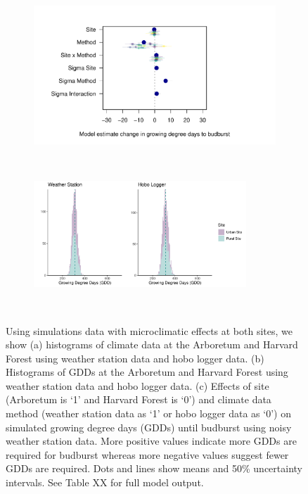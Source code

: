 \documentclass{article}\usepackage[]{graphicx}\usepackage[]{color}
\begin{document}
\begin{figure}[H]
  \begin{subfigure}{.5\linewidth}
    \caption{}
      \centering
      \includegraphics[height=7cm, width=11cm]{..//analyses/figures/muplot_micros.pdf}
      \label{fig:muplotmicros}
  \end{subfigure}%
    \begin{subfigure}{.5\linewidth}
      \caption{}
      \centering
      \includegraphics[height=4cm, width=8cm]{..//analyses/figures/gdd_methods_micros.pdf}
    \label{fig:gddmicros}
  \end{subfigure}\\[1ex]
\caption{ Using simulations data with microclimatic effects at both sites, we show (a) histograms of climate data at the Arboretum and Harvard Forest using weather station data and hobo logger data. (b) Histograms of GDDs at the Arboretum and Harvard Forest using weather station data and hobo logger data. (c) Effects of site (Arboretum is `1' and Harvard Forest is `0') and climate data method (weather station data as `1' or hobo logger data as `0') on simulated growing degree days (GDDs) until budburst using noisy weather station data. More positive values indicate more GDDs are required for budburst whereas more negative values suggest fewer GDDs are required. Dots and lines show means and 50\% uncertainty intervals. See Table XX for full model output.}
\label{fig:micros}
\end{figure}
\end{document}
